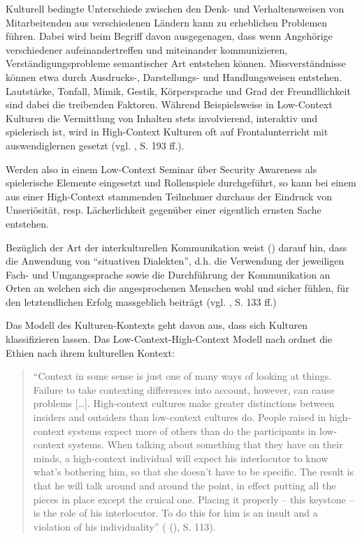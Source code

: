 \documentclass[../../main.tex]{subfiles}
\begin{document}
\begin{sloppypar}
Kulturell bedingte Unterschiede zwischen den Denk- und Verhaltensweisen von Mitarbeitenden aus verschiedenen Ländern kann zu erheblichen Problemen führen. Dabei wird beim Begriff  davon ausgegenagen, dass wenn Angehörige verschiedener  aufeinandertreffen und miteinander kommunizieren, Verständigungsprobleme semantischer Art entstehen können. Missverständnisse können etwa durch Ausdrucks-, Darstellungs- und Handlungsweisen entstehen. Lautstärke, Tonfall, Mimik, Gestik, Körpersprache und Grad der Freundllichkeit sind dabei die treibenden Faktoren. Während Beispielsweise in Low-Context Kulturen die Vermittlung von Inhalten stets involvierend, interaktiv und spielerisch ist, wird in High-Context Kulturen oft auf Frontalunterricht mit auswendiglernen gesetzt (vgl. \citeauthor{helisch_security_2009} \citeyear{helisch_security_2009}, S. 193 ff.).

Werden also in einem Low-Context Seminar über Security Awareness als spielerische Elemente eingesetzt und Rollenspiele durchgeführt, so kann bei einem aus einer High-Context stammenden Teilnehmer durchaus der Eindruck von Unseriösität, resp. Lächerlichkeit gegenüber einer eigentlich ernsten Sache entstehen.

Bezüglich der Art der interkulturellen Kommunikation weist \citeauthor{hall_beyond_1976} (\citeyear{hall_beyond_1976}) darauf hin, dass die Anwendung von "`situativen Dialekten"', d.h. die Verwendung der jeweiligen Fach- und Umgangssprache sowie die Durchführung der Kommunikation an Orten an welchen sich die angesprochenen Menschen wohl und sicher fühlen, für den letztendlichen Erfolg massgeblich beiträgt (vgl. \citeauthor{hall_beyond_1976} \citeyear{hall_beyond_1976}, S. 133 ff.)

Das Modell des Kulturen-Kontexts geht davon aus, dass sich Kulturen klassifizieren lassen. Das Low-Context-High-Context Modell nach \citeauthor{hall_beyond_1976} ordnet die Ethien nach ihrem kulturellen Kontext:  

\begin{quote}
"`Context in some sense is just one of many ways of looking at things. Failure to take contexting differences into account, however, can cause problems [\dots]. High-context cultures make greater distinctions between insiders and outsiders than low-context cultures do. People raised in high-context systems expect more of others than do the participants in low-context systems. When talking about something that they have on their minds, a high-context individual will expect his interlocutor to know what’s bothering him, so that she doesn't have to be specific. The result is that he will talk around and around the point, in effect putting all the pieces in place except the cruical one. Placing it properly -- this keystone -- is the role of his interlocutor. To do this for him is an insult and a violation of his individuality"' (\citeauthor{hall_beyond_1976} (\citeyear{hall_beyond_1976}), S. 113).
\end{quote}


\end{sloppypar}
\end{document}
